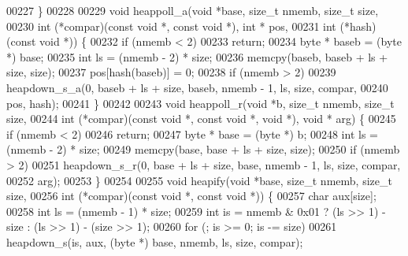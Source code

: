 \begin{DoxyCode}
00227 \}
00228 
00229 \textcolor{keywordtype}{void} heappoll_a(\textcolor{keywordtype}{void} *base, \textcolor{keywordtype}{size\_t} nmemb, \textcolor{keywordtype}{size\_t} size,
00230                 \textcolor{keywordtype}{int} (*compar)(\textcolor{keyword}{const} \textcolor{keywordtype}{void} *, \textcolor{keyword}{const} \textcolor{keywordtype}{void} *), \textcolor{keywordtype}{int} * pos,
00231                 \textcolor{keywordtype}{int} (*hash)(\textcolor{keyword}{const} \textcolor{keywordtype}{void} *)) \{
00232         \textcolor{keywordflow}{if} (nmemb < 2)
00233                 \textcolor{keywordflow}{return};
00234         byte * baseb = (byte *) base;
00235         \textcolor{keywordtype}{int} ls = (nmemb - 2) * size;
00236         memcpy(baseb, baseb + ls + size, size);
00237         pos[hash(baseb)] = 0;
00238         \textcolor{keywordflow}{if} (nmemb > 2)
00239                 heapdown\_s\_a(0, baseb + ls + size, baseb, nmemb - 1, ls, size, compar,
00240                                 pos, hash);
00241 \}
00242 
00243 \textcolor{keywordtype}{void} heappoll\_r(\textcolor{keywordtype}{void} *b, \textcolor{keywordtype}{size\_t} nmemb, \textcolor{keywordtype}{size\_t} size,
00244                 \textcolor{keywordtype}{int} (*compar)(\textcolor{keyword}{const} \textcolor{keywordtype}{void} *, \textcolor{keyword}{const} \textcolor{keywordtype}{void} *, \textcolor{keywordtype}{void} *), \textcolor{keywordtype}{void} * arg) \{
00245         \textcolor{keywordflow}{if} (nmemb < 2)
00246                 \textcolor{keywordflow}{return};
00247         byte * base = (byte *) b;
00248         \textcolor{keywordtype}{int} ls = (nmemb - 2) * size;
00249         memcpy(base, base + ls + size, size);
00250         \textcolor{keywordflow}{if} (nmemb > 2)
00251                 heapdown\_s\_r(0, base + ls + size, base, nmemb - 1, ls, size, compar,
00252                                 arg);
00253 \}
00254 
00255 \textcolor{keywordtype}{void} heapify(\textcolor{keywordtype}{void} *base, \textcolor{keywordtype}{size\_t} nmemb, \textcolor{keywordtype}{size\_t} size,
00256                 \textcolor{keywordtype}{int} (*compar)(\textcolor{keyword}{const} \textcolor{keywordtype}{void} *, \textcolor{keyword}{const} \textcolor{keywordtype}{void} *)) \{
00257         \textcolor{keywordtype}{char} aux[size];
00258         \textcolor{keywordtype}{int} ls = (nmemb - 1) * size;
00259         \textcolor{keywordtype}{int} is = nmemb & 0x01 ? (ls >> 1) - size : (ls >> 1) - (size >> 1);
00260         \textcolor{keywordflow}{for} (; is >= 0; is -= size)
00261                 heapdown\_s(is, aux, (byte *) base, nmemb, ls, size, compar);

\end{DoxyCode}
